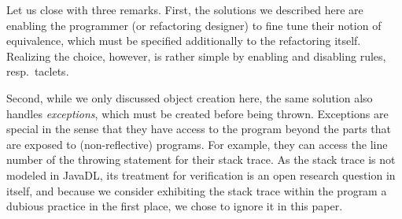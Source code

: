 

Let us close with three remarks. First, the solutions we described here are enabling the programmer (or refactoring designer) to fine tune their notion of equivalence, which must be specified additionally to the refactoring itself.
Realizing the choice, however, is rather simple by enabling and disabling rules, resp.\ taclets. 

Second, while we only discussed object creation here, the same solution also handles \emph{exceptions}, which must be created before being thrown. 
Exceptions are special in the sense that they have access to the program beyond the parts that are exposed to (non-reflective) programs.
For example, they can access the line number of the throwing statement for their stack trace.
As the stack trace is not modeled in JavaDL, its treatment for verification is an open research question in itself, and because we consider exhibiting the stack trace
within the program a dubious practice in the first place, we chose to ignore it in this paper.

